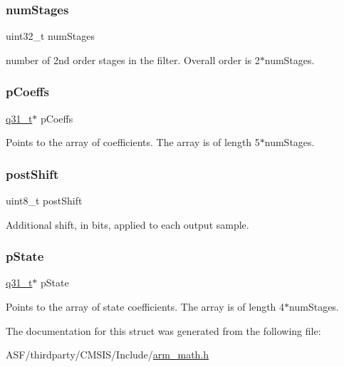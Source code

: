 \subsubsection{\texorpdfstring{numStages}{numStages}}
{\footnotesize\ttfamily uint32\+\_\+t num\+Stages}

number of 2nd order stages in the filter. Overall order is 2$\ast$num\+Stages. \mbox{\label{structarm__biquad__casd__df1__inst__q31_a68888e36167d81cb7836db10367a1682}} 
\subsubsection{\texorpdfstring{pCoeffs}{pCoeffs}}
{\footnotesize\ttfamily \mbox{\hyperlink{arm__math_8h_adc89a3547f5324b7b3b95adec3806bc0}{q31\+\_\+t}}$\ast$ p\+Coeffs}

Points to the array of coefficients. The array is of length 5$\ast$num\+Stages. \mbox{\label{structarm__biquad__casd__df1__inst__q31_a74050e9f36542bd56f4052381a82ae8f}} 
\subsubsection{\texorpdfstring{postShift}{postShift}}
{\footnotesize\ttfamily uint8\+\_\+t post\+Shift}

Additional shift, in bits, applied to each output sample. \mbox{\label{structarm__biquad__casd__df1__inst__q31_adee4ba3ee8869865af7d8fa08ca913d6}} 
\subsubsection{\texorpdfstring{pState}{pState}}
{\footnotesize\ttfamily \mbox{\hyperlink{arm__math_8h_adc89a3547f5324b7b3b95adec3806bc0}{q31\+\_\+t}}$\ast$ p\+State}

Points to the array of state coefficients. The array is of length 4$\ast$num\+Stages. 

The documentation for this struct was generated from the following file\+:\begin{DoxyCompactItemize}
\item 
A\+S\+F/thirdparty/\+C\+M\+S\+I\+S/\+Include/\mbox{\hyperlink{arm__math_8h}{arm\+\_\+math.\+h}}\end{DoxyCompactItemize}

